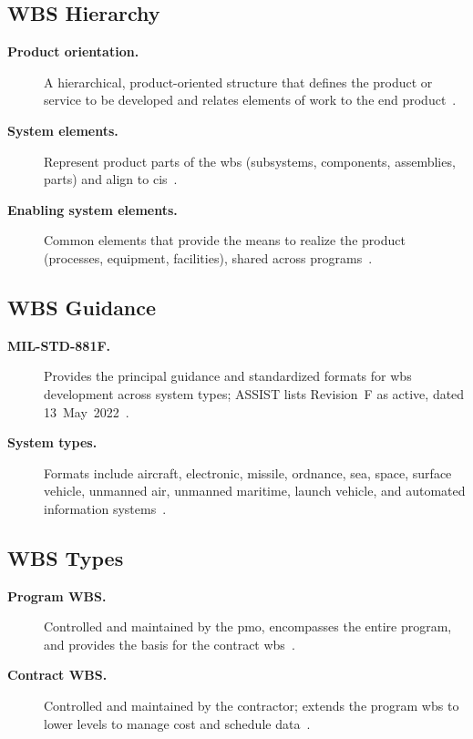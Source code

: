 \documentclass[../main.tex]{subfiles}
\begin{document}
\subsection{WBS Hierarchy}
\begin{description}
  \item[\textbf{Product orientation.}] A hierarchical, product-oriented structure that defines the product or service to be developed and relates elements of work to the end product~\autocite{edo-3-5-2-wbs-2025}.
  \item[\textbf{System elements.}] Represent product parts of the \ac{wbs} (subsystems, components, assemblies, parts) and align to \acp{ci}~\autocite{edo-3-5-2-wbs-2025}.
  \item[\textbf{Enabling system elements.}] Common elements that provide the means to realize the product (processes, equipment, facilities), shared across programs~\autocite{edo-3-5-2-wbs-2025}.
\end{description}

\subsection{WBS Guidance}
\begin{description}
  \item[\textbf{MIL-STD-881F.}] Provides the principal guidance and standardized formats for \ac{wbs} development across system types; ASSIST lists Revision~F as active, dated 13~May~2022~\autocite{edo-3-5-2-wbs-2025,MILSTD-881F}.
  \item[\textbf{System types.}] Formats include aircraft, electronic, missile, ordnance, sea, space, surface vehicle, unmanned air, unmanned maritime, launch vehicle, and automated information systems~\autocite{edo-3-5-2-wbs-2025}.
\end{description}

\subsection{WBS Types}
\begin{description}
  \item[\textbf{Program WBS.}] Controlled and maintained by the \ac{pmo}, encompasses the entire program, and provides the basis for the contract \ac{wbs}~\autocite{edo-3-5-2-wbs-2025}.
  \item[\textbf{Contract WBS.}] Controlled and maintained by the contractor; extends the program \ac{wbs} to lower levels to manage cost and schedule data~\autocite{edo-3-5-2-wbs-2025}.
\end{description}
\end{document}
